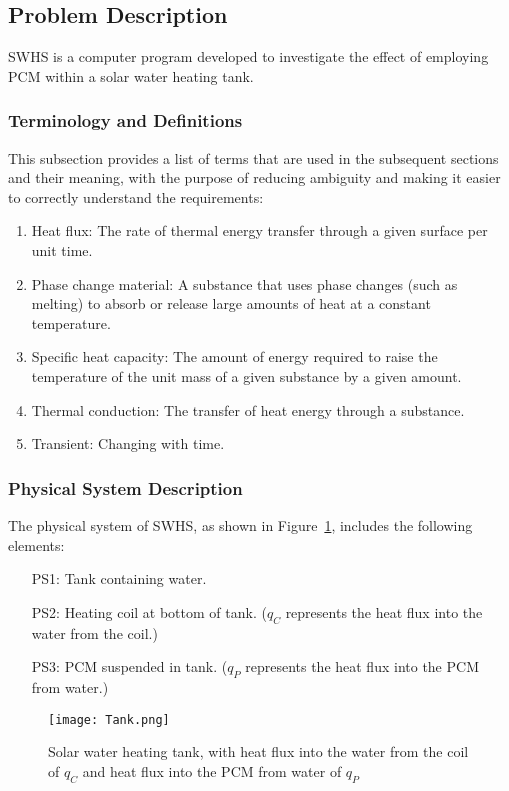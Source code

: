 \documentclass[12pt]{article}
\begin{document}
\subsection{Problem Description}
\label{Sec:ProbDesc}
SWHS is a computer program developed to investigate the effect of employing PCM within a solar water heating tank.
\subsubsection{Terminology and Definitions}
\label{Sec:TermandDefi}
This subsection provides a list of terms that are used in the subsequent sections and their meaning, with the purpose of reducing ambiguity and making it easier to correctly understand the requirements:
\begin{enumerate}
\item{Heat flux: The rate of thermal energy transfer through a given surface per unit time.}
\item{Phase change material: A substance that uses phase changes (such as melting) to absorb or release large amounts of heat at a constant temperature.}
\item{Specific heat capacity: The amount of energy required to raise the temperature of the unit mass of a given substance by a given amount.}
\item{Thermal conduction: The transfer of heat energy through a substance.}
\item{Transient: Changing with time.}
\end{enumerate}
\subsubsection{Physical System Description}
\label{Sec:PhysSystDesc}
The physical system of SWHS, as shown in Figure~\ref{Figure:SolawateheattankwithheatfluxintothewatefromthecoilofandheatfluxintothePCMfromwateof}, includes the following elements:
\begin{itemize}
\item[PS1:]Tank containing water.
\item[PS2:]Heating coil at bottom of tank. ($q_{C}$ represents the heat flux into the water from the coil.)
\item[PS3:]PCM suspended in tank. ($q_{P}$ represents the heat flux into the PCM from water.)
\end{itemize}
\begin{figure}
\begin{center}
\texttt{[image: Tank.png]}
\caption{Solar water heating tank, with heat flux into the water from the coil of $q_{C}$ and heat flux into the PCM from water of $q_{P}$}
\label{Figure:SolawateheattankwithheatfluxintothewatefromthecoilofandheatfluxintothePCMfromwateof}
\end{center}
\end{figure}
\end{document}
